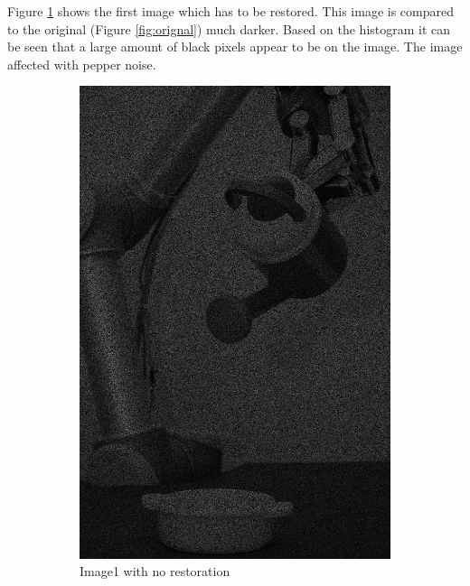 Figure \ref{fig:img1_src} shows the first image which has to be restored. This image is compared to the original  (Figure \ref{fig:orignal}) much darker.  Based on the histogram  it can be seen that a large amount of black pixels appear to be on the image.  The image affected with pepper noise.  

\begin{figure}[H]
    \centering
    \begin{subfigure}[b]{0.23\textwidth}
        \includegraphics[width=\textwidth]{img1/Image1.png}
        \caption{Image1 with no restoration}
        \label{fig:img1_src}
    \end{subfigure}
    \begin{subfigure}[b]{0.446\textwidth}

\end{subfigure}
\end{figure}
